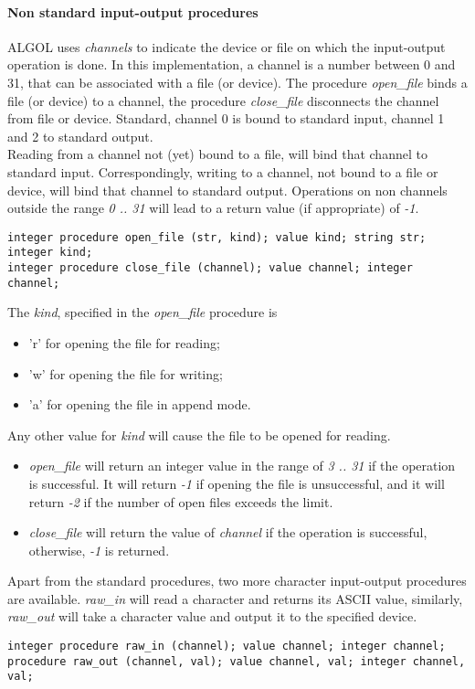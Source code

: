 \documentclass[11pt]{article}
\begin{document}
\paragraph{Non standard input-output procedures}
ALGOL uses {\em channels} to indicate the device or file
on which the input-output operation is done.
In this implementation, a channel is a number between 0 and 31,
that can be associated with a file (or device).
The procedure {\em open\_file} binds a file (or device) to a channel,
the procedure {\em close\_file} disconnects the channel from file or device.
Standard, channel 0 is bound to standard input, channel 1 and 2 to standard output.
\ \\
Reading from a channel not (yet) bound to a file,
will bind that channel to standard input.
Correspondingly, writing to a channel, not bound to a file or device,
will bind that channel to standard output.
Operations on non channels outside the range {\em 0 .. 31} will
lead to a return value (if appropriate) of {\em -1}.
{\footnotesize
\begin{verbatim}
integer procedure open_file (str, kind); value kind; string str; integer kind; 
integer procedure close_file (channel); value channel; integer channel; 
\end{verbatim}
}
The {\em kind}, specified in the {\em open\_file} procedure is
\begin{itemize}
\item 'r' for opening the file for reading;
\item 'w' for opening the file for writing;
\item 'a' for opening the file in append mode.
\end{itemize}
Any other value for {\em kind} will cause the file to be opened for reading.

\begin{itemize}
\item {\em open\_file} will return an integer value in
the range of {\em 3 .. 31} if the operation is successful.
It will return  {\em -1} if opening the file is unsuccessful,
and it will return {\em -2} if the number of open files exceeds the limit.
\item
{\em close\_file} will return the value of {\em channel}
if the operation is successful, otherwise, {\em -1} is returned.
\end{itemize}
Apart from the standard procedures, two more character input-output procedures
are available.
{\em raw\_in} will read a character and returns its ASCII value, similarly,
{\em raw\_out} will take a character value and output it to the specified device.
{\footnotesize
\begin{verbatim}
integer procedure raw_in (channel); value channel; integer channel; 
procedure raw_out (channel, val); value channel, val; integer channel, val; 
\end{verbatim}
}
\end{document}

